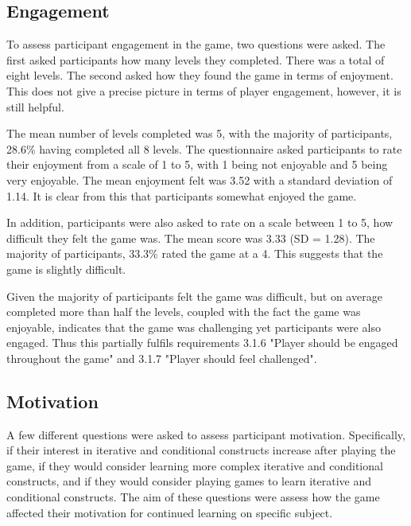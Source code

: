 \documentclass[a4paper,11.5pt]{report}
\numberwithin{figure}{section}
\numberwithin{table}{section}
\numberwithin{equation}{section}
\numberwithin{equation}{section}
\begin{document}

\subsection{Engagement}


To assess participant engagement in the game, two questions were asked. The first asked participants how many levels they completed. There was a total of eight levels. The second asked how they found the game in terms of enjoyment. This does not give a precise picture in terms of player engagement, however, it is still helpful. 

The mean number of levels completed was 5, with the majority of participants, 28.6\% having completed all 8 levels. The questionnaire asked participants to rate their enjoyment from a scale of 1 to 5, with 1 being not enjoyable and 5 being very enjoyable. The mean enjoyment felt was 3.52 with a standard deviation of 1.14. It is clear from this that participants somewhat enjoyed the game.

In addition, participants were also asked to rate on a scale between 1 to 5, how difficult they felt the game was. The mean score was 3.33 (SD = 1.28). The majority of participants, 33.3\% rated the game at a 4. This suggests that the game is slightly difficult.

Given the majority of participants felt the game was difficult, but on average completed more than half the levels, coupled with the fact the game was enjoyable, indicates that the game was challenging yet participants were also engaged. Thus this partially fulfils requirements 3.1.6 "Player should be engaged throughout the game" and 3.1.7 "Player should feel challenged".

\subsection{Motivation}

A few different questions were asked to assess participant motivation. Specifically, if their interest in iterative and conditional constructs increase after playing the game, if they would consider learning more complex iterative and conditional constructs, and if they would consider playing games to learn iterative and conditional constructs. The aim of these questions were assess how the game affected their motivation for continued learning on specific subject.
\end{document}
